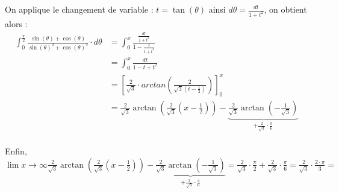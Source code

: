 \documentclass[a4paper,10pt]{article}
\begin{document}
On applique le changement de variable : $t=\tan(\theta)$ ainsi $d\theta = \frac{dt}{1+t^2}$, on obtient alors : \\
\begin{align*}
\int_0^{\frac{\pi}{2}} \frac{\sin(\theta) + \cos(\theta)}{\sin(\theta)^3 + \cos(\theta)^3} \cdot d\theta &=\int_0^{x} \frac{\frac{dt}{1+t^2}}{1 - \frac{t}{1+t^2}}  \\
&=\int_0^{x} \frac{dt}{1-t+t^2} \\
&= \left[ \frac{2}{\sqrt{3}}\cdot arctan(\frac{2}{\sqrt{3}(t-\frac{1}{2})}) \right]_0^x\\
&= \frac{2}{\sqrt{3}}\arctan(\frac{2}{\sqrt{3}}(x-\frac{1}{2}))-\underbrace{\frac{2}{\sqrt{3}}\arctan(-\frac{1}{\sqrt{3}})}_{+\frac{2}{\sqrt{3}} \cdot \frac{\pi}{6}} \\
\end{align*}

Enfin, \\

$\lim{x\to\infty} \frac{2}{\sqrt{3}}\arctan(\frac{2}{\sqrt{3}}(x-\frac{1}{2}))-\underbrace{\frac{2}{\sqrt{3}}\arctan(-\frac{1}{\sqrt{3}})}_{+\frac{2}{\sqrt{3}} \cdot \frac{\pi}{6}} = \frac{2}{\sqrt{3}} \cdot \frac{\pi}{2} + \frac{2}{\sqrt{3}} \cdot \frac{\pi}{6} = \frac{2}{\sqrt{3}} \cdot \frac{2 \cdot \pi}{3} =$ 
\end{document}
